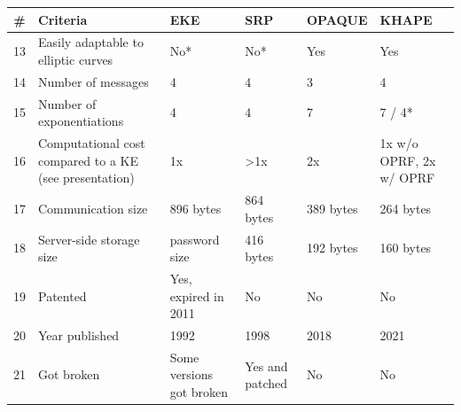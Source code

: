 ﻿\documentclass[../report.tex]{subfiles}
\begin{document}
\begin{center}
   \begin{tabular}{ | c | p{5cm} || p{2cm} | p{2cm} | p{2cm} | p{2cm} | }
     \hline
     \textbf{\#} & \textbf{Criteria} & \textbf{EKE} & \textbf{SRP} & \textbf{OPAQUE} & \textbf{KHAPE} \\ \hline
     
     13 & Easily adaptable to elliptic curves & No* & No* & Yes & Yes \\ \hline
     14 & Number of messages & 4 & 4 & 3 & 4 \\ \hline
     15 & Number of exponentiations & 4 & 4 & 7 & 7 / 4* \\ \hline
     16 & Computational cost compared to a KE (see \cite{KHAPE_Paper} presentation) & 1x & >1x & 2x & 1x w/o OPRF, 2x w/ OPRF \\ \hline
     17 & Communication size & 896 bytes & 864 bytes & 389 bytes & 264 bytes \\ \hline
     18 & Server-side storage size & password size & 416 bytes & 192 bytes & 160 bytes \\ \hline
     
     19 & Patented & Yes, expired in 2011 & No & No & No \\ \hline
     20 & Year published & 1992 & 1998 & 2018 & 2021 \\ \hline
     21 & Got broken & Some versions got broken & Yes and patched \cite{CAA} & No & No \\ \hline
     \end{tabular}
 \end{center}
\end{document}
